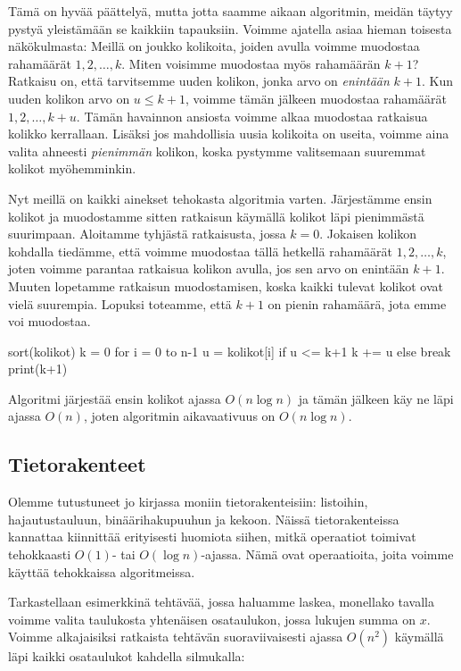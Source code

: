 Tämä on hyvää päättelyä, mutta jotta saamme aikaan algoritmin,
meidän täytyy pystyä yleistämään se kaikkiin tapauksiin.
Voimme ajatella asiaa hieman toisesta näkökulmasta:
Meillä on joukko kolikoita, joiden avulla voimme muodostaa
rahamäärät $1,2,\dots,k$.
Miten voisimme muodostaa myös rahamäärän $k+1$?
Ratkaisu on, että tarvitsemme uuden kolikon,
jonka arvo on \emph{enintään} $k+1$.
Kun uuden kolikon arvo on $u \le k+1$,
voimme tämän jälkeen muodostaa rahamäärät $1,2,\dots,k+u$.
Tämän havainnon ansiosta voimme alkaa muodostaa ratkaisua
kolikko kerrallaan.
Lisäksi jos mahdollisia uusia kolikoita on useita,
voimme aina valita ahneesti \emph{pienimmän} kolikon,
koska pystymme valitsemaan suuremmat kolikot myöhemminkin.

Nyt meillä on kaikki ainekset tehokasta algoritmia varten.
Järjes\-tämme ensin kolikot ja muodostamme sitten ratkaisun
käymällä kolikot läpi pienimmästä suurimpaan.
Aloitamme tyhjästä ratkaisusta, jossa $k=0$.
Jokaisen kolikon kohdalla tiedämme,
että voimme muodostaa tällä hetkellä rahamäärät $1,2,\dots,k$,
joten voimme parantaa ratkaisua kolikon avulla,
jos sen arvo on enintään $k+1$.
Muuten lopetamme ratkaisun muodostamisen,
koska kaikki tulevat kolikot ovat vielä suurempia.
Lopuksi toteamme, että $k+1$ on pienin rahamäärä,
jota emme voi muodostaa.

\begin{code}
sort(kolikot)
k = 0
for i = 0 to n-1
    u = kolikot[i]
    if u <= k+1
        k += u
    else
        break
print(k+1)
\end{code}

Algoritmi järjestää ensin kolikot ajassa $O(n \log n)$
ja tämän jälkeen käy ne läpi ajassa $O(n)$,
joten algoritmin aikavaativuus on $O(n \log n)$.

\subsection{Tietorakenteet}

Olemme tutustuneet jo kirjassa moniin tietorakenteisiin:
listoihin, hajautustauluun, binäärihakupuuhun ja kekoon.
Näissä tietorakenteissa kannattaa kiinnittää erityisesti huomiota siihen,
mitkä operaatiot toimivat tehokkaasti $O(1)$- tai $O(\log n)$-ajassa.
Nämä ovat operaatioita, joita voimme käyttää tehokkaissa algoritmeissa.

Tarkastellaan esimerkkinä tehtävää, jossa haluamme laskea,
monellako tavalla voimme valita taulukosta yhtenäisen osataulukon,
jossa lukujen summa on $x$.
Voimme alkajaisiksi ratkaista tehtävän suoraviivaisesti ajassa $O(n^2)$
käymällä läpi kaikki osataulukot kahdella silmukalla:

